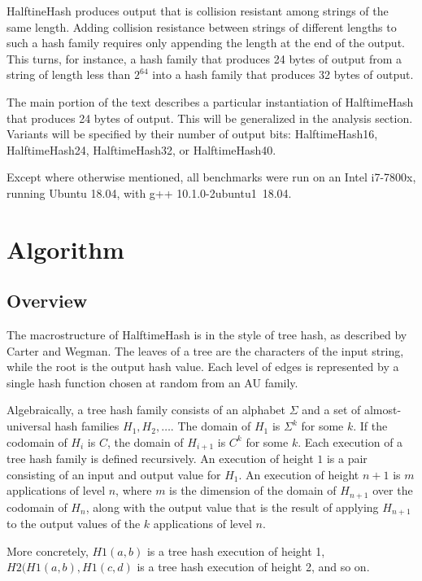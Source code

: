 \documentclass[sigconf, nonacm]{acmart}
\begin{document}
HalftineHash produces output that is collision resistant among strings of the same length.
Adding collision resistance between strings of different lengths to such a hash family requires only appending the length at the end of the output.
This turns, for instance, a hash family that produces 24 bytes of output from a string of length less than $2^64$ into a hash family that produces 32 bytes of output.

The main portion of the text describes a particular instantiation of HalftimeHash that produces 24 bytes of output.
This will be generalized in the analysis section.
Variants will be specified by their number of output bits: HalftimeHash16, HalftimeHash24, HalftimeHash32, or HalftimeHash40.

Except where otherwise mentioned, all benchmarks were run on an Intel i7-7800x, running Ubuntu 18.04, with g++ 10.1.0-2ubuntu1~18.04.

\section{Algorithm}
\label{algo}

\subsection{Overview}

The macrostructure of HalftimeHash is in the style of tree hash, as described by Carter and Wegman. \cite{carter-wegman-79}
The leaves of a tree are the characters of the input string, while the root is the output hash value.
Each level of edges is represented by a single hash function chosen at random from an AU family.

Algebraically, a tree hash family consists of an alphabet $\Sigma$ and a set of almost-universal hash families $H_1, H_2, \dots$.
The domain of $H_1$ is $\Sigma^k$ for some $k$.
If the codomain of $H_i$ is $C$, the domain of $H_{i+1}$ is $C^k$ for some $k$.
Each execution of a tree hash family is defined recursively.
An execution of height $1$ is a pair consisting of an input and output value for $H_1$.
An execution of height $n+1$ is $m$ applications of level $n$, where $m$ is the dimension of the domain of $H_{n+1}$ over the codomain of $H_n$, along with the output value that is the result of applying $H_{n+1}$ to the output values of the $k$ applications of level $n$.

More concretely, $H1(a,b)$ is a tree hash execution of height 1, $H2(H1(a,b), H1(c,d)$ is a tree hash execution of height 2, and so on.
\end{document}
